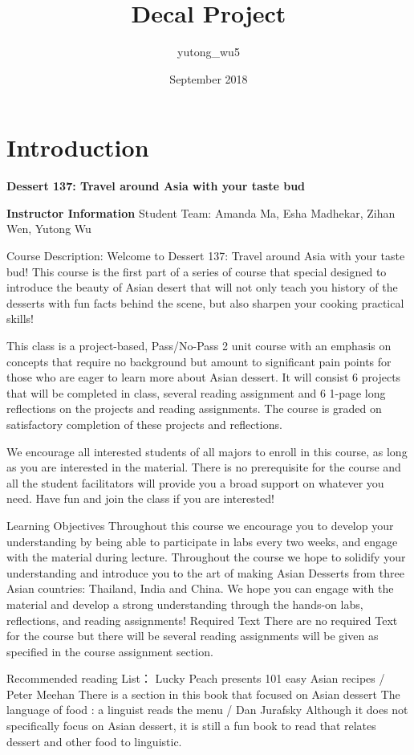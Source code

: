\documentclass{article}
\title{Decal Project}
\author{yutong_wu5 }
\date{September 2018}
\begin{document}
\maketitle

\section{Introduction}

\textbf{Dessert 137: Travel around Asia with your taste bud}
\hfill

\textbf{Instructor Information}
Student Team: Amanda Ma, Esha Madhekar, Zihan Wen, Yutong Wu

Course Description:
Welcome to Dessert 137: Travel around Asia with your taste bud! This course is the first part of a series of course that special designed to introduce the beauty of Asian desert that will not only teach you history of the desserts with fun facts behind the scene, but also sharpen your cooking practical skills!

This class is a project-based, Pass/No-Pass 2 unit course with an emphasis on concepts that require no background but amount to significant pain points for those who are eager to learn more about Asian dessert. It will consist 6 projects that will be completed in class, several reading assignment and 6 1-page long reflections on the projects and reading assignments. The course is graded on satisfactory completion of these projects and reflections.

We encourage all interested students of all majors to enroll in this course, as long as you are interested in the material. There is no prerequisite for the course and all the student facilitators will provide you a broad support on whatever you need. Have fun and join the class if you are interested!

Learning Objectives
Throughout this course we encourage you to develop your understanding by being able to participate in labs every two weeks, and engage with the material during lecture. Throughout the course we hope to solidify your understanding and introduce you to the art of making Asian Desserts from three Asian countries: Thailand, India and China. We hope you can engage with the material and develop a strong understanding through the hands-on labs, reflections, and reading assignments!
Required Text
There are no required Text for the course but there will be several reading assignments will be given as specified in the course assignment section. 

Recommended reading List：
Lucky Peach presents 101 easy Asian recipes / Peter Meehan 
There is a section in this book that focused on Asian dessert
The language of food : a linguist reads the menu / Dan Jurafsky
Although it does not specifically focus on Asian dessert, it is still a fun book to read that relates dessert and other food to linguistic.
\end{document}
